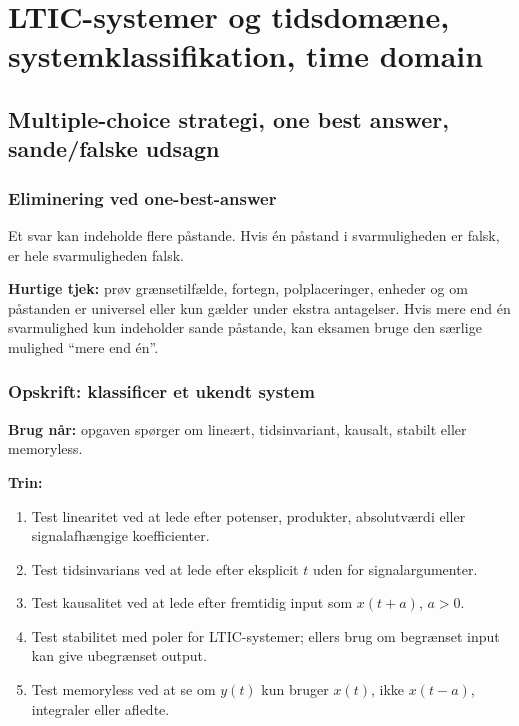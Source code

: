 \section{LTIC-systemer og tidsdomæne, systemklassifikation, time domain}

\subsection{Multiple-choice strategi, one best answer, sande/falske udsagn}

\subsubsection{Eliminering ved one-best-answer}
Et svar kan indeholde flere påstande. Hvis én påstand i svarmuligheden er falsk, er hele svarmuligheden falsk.

\textbf{Hurtige tjek:} prøv grænsetilfælde, fortegn, polplaceringer, enheder og om påstanden er universel eller kun gælder under ekstra antagelser. Hvis mere end én svarmulighed kun indeholder sande påstande, kan eksamen bruge den særlige mulighed ``mere end én''.

\subsubsection{Opskrift: klassificer et ukendt system}
\textbf{Brug når:} opgaven spørger om lineært, tidsinvariant, kausalt, stabilt eller memoryless.

\textbf{Trin:}
\begin{enumerate}
    \item Test linearitet ved at lede efter potenser, produkter, absolutværdi eller signalafhængige koefficienter.
    \item Test tidsinvarians ved at lede efter eksplicit \(t\) uden for signalargumenter.
    \item Test kausalitet ved at lede efter fremtidig input som \(x(t+a)\), \(a>0\).
    \item Test stabilitet med poler for LTIC-systemer; ellers brug om begrænset input kan give ubegrænset output.
    \item Test memoryless ved at se om \(y(t)\) kun bruger \(x(t)\), ikke \(x(t-a)\), integraler eller afledte.
\end{enumerate}

